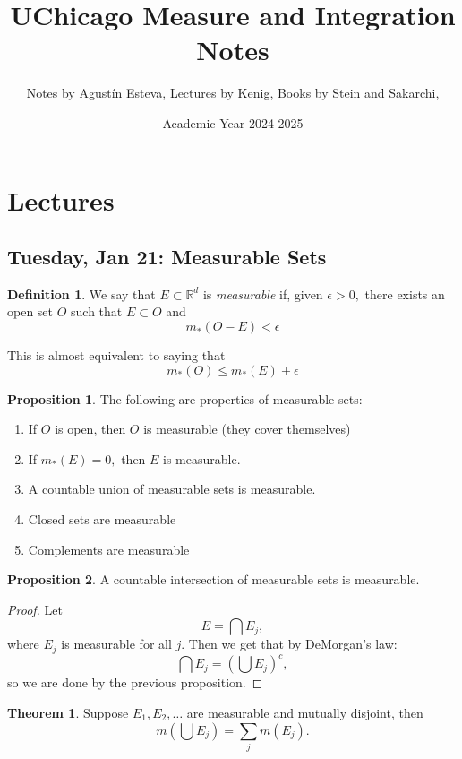 \documentclass[10pt, oneside]{article}
\title{UChicago Measure and Integration Notes}
\author{Notes by Agustín Esteva, Lectures by Kenig, Books by Stein and Sakarchi, }
\date{Academic Year 2024-2025}
\newcommand{\bbR}{\mathbb{R}}
\theoremstyle{definition}
\newtheorem{thm}{Theorem}
\newtheorem{defn}{Definition}
\newtheorem{prop}{Proposition}
\begin{document}
\maketitle
\tableofcontents

\vspace{.25in}
\newpage
\section{Lectures}

\subsection{Tuesday, Jan 21: Measurable Sets}
\begin{defn}
    We say that $E \subset \bbR^d$ is \textit{measurable} if, given $\epsilon>0,$ there exists an open set $O$ such that $E \subset O$ and 
    \[m_\ast(O - E)< \epsilon\]
\end{defn}
This is almost equivalent to saying that 
\[m_\ast(O) \leq m_\ast(E) + \epsilon\]
\begin{prop}
    The following are properties of measurable sets:
    \begin{enumerate}
        \item If $O$ is open, then $O$ is measurable (they cover themselves)
        \item If $m_\ast(E) = 0,$ then $E$ is measurable.
        \item A countable union of measurable sets is measurable.
        \item Closed sets are measurable
        \item Complements are measurable
    \end{enumerate}
\end{prop}
\begin{prop}
    A countable intersection of measurable sets is measurable.
\end{prop}
\begin{proof}
    Let 
    \[E = \bigcap E_j,\] where $E_j$ is measurable for all $j.$ Then we get that by DeMorgan's law:
    \[\bigcap E_j = \left(\bigcup E_j\right)^c,\] so we are done by the previous proposition.
\end{proof}
\begin{thm}
    Suppose $E_1, E_2, \dots$ are measurable and mutually disjoint, then 
    \[m\left(\bigcup E_j\right) = \sum_j m(E_j).\]
\end{thm}
\end{document}
